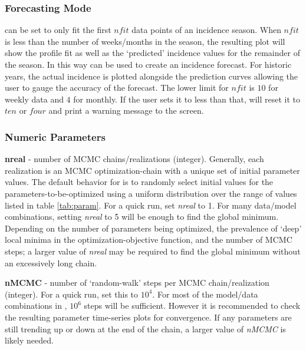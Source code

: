 \documentclass[a4paper]{article}
\begin{document}
\subsubsection*{Forecasting Mode}
 can be set to only fit the first $nfit$ data points of an incidence season.  When $nfit$ is less than the number of weeks/months in the season, the resulting plot will show the profile fit as well as the `predicted' incidence values for the remainder of the season.  In this way  can be used to create an incidence forecast.  For historic years, the actual incidence is plotted alongside the prediction curves allowing the user to gauge the accuracy of the forecast. The lower limit for $nfit$ is $10$ for weekly data and $4$ for monthly. If the user sets it to less than that,  will reset it to $ten$ or $four$  and print a warning message to the screen.

\subsubsection*{Numeric Parameters}
\hspace{\parindent}\textbf{nreal} - number of MCMC chains/realizations (integer).  Generally, each realization is an MCMC optimization-chain with a unique set of initial parameter values.  The default behavior for  is to randomly select initial values for the parameters-to-be-optimized using a uniform distribution over the range of values listed in table \ref{tab:param}.  For a quick run, set \textit{nreal} to 1.  For many data/model combinations, setting \textit{nreal} to 5 will be enough to find the global minimum.  Depending on the number of parameters being optimized, the prevalence of `deep' local minima in the optimization-objective function, and the number of MCMC steps; a larger value of \textit{nreal} may be required to find the global minimum without an excessively long chain.

  \textbf{nMCMC} - number of `random-walk' steps per MCMC chain/realization (integer).  For a quick run, set this to $10^4$.  For most of the model/data combinations in , $10^6$ steps will be sufficient. However it is recommended to check the resulting parameter time-series plots for convergence.  If any parameters are still trending up or down at the end of the chain, a larger value of \textit{nMCMC} is likely needed.

\end{document}
